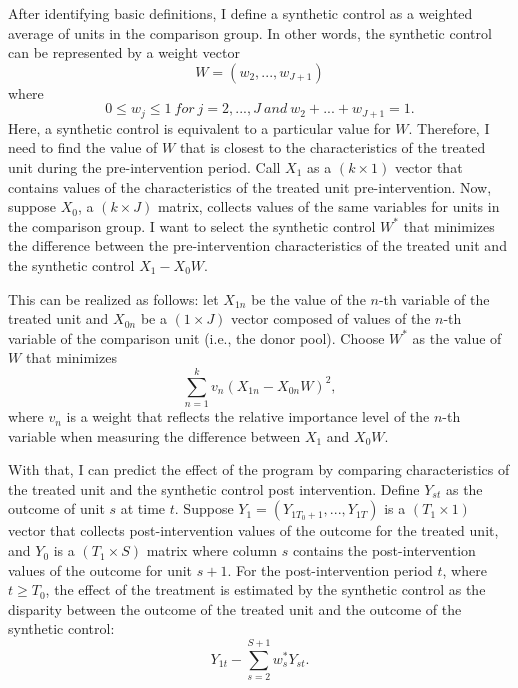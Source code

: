 \noindent After identifying basic definitions, I define a synthetic control as a weighted average of units in the comparison group. In other words, the synthetic control can be represented by a weight vector
\[
W=(w_2,...,w_{J+1})
\]
where 
\[
0\leq w_j\leq 1~for~j=2,...,J~and~w_2+...+w_{J+1}=1.
\]
Here, a synthetic control is equivalent to a particular value for $W$. Therefore, I need to find the value of $W$ that is closest to the characteristics of the treated unit during the pre-intervention period. Call $X_1$ as a $(k\times 1)$ vector that contains values of the characteristics of the treated unit pre-intervention. Now, suppose $X_0$, a $(k\times J)$ matrix, collects values of the same variables for units in the comparison group. I want to select the synthetic control $W^*$ that minimizes the difference between the pre-intervention characteristics of the treated unit and the synthetic control $X_1-X_0W$.

\noindent This can be realized as follows: let $X_{1n}$ be the value of the $n$-th variable of the treated unit and $X_{0n}$ be a $(1\times J)$ vector composed of values of the $n$-th variable of the comparison unit (i.e., the donor pool). Choose $W^*$ as the value of $W$ that minimizes
\[
\sum^k_{n=1}v_n(X_{1n}-X_{0n}W)^2,
\]
where $v_n$ is a weight that reflects the relative importance level of the $n$-th variable when measuring the difference between $X_1$ and $X_0W$.

\noindent With that, I can predict the effect of the program by comparing characteristics of the treated unit and the synthetic control post intervention. Define $Y_{st}$ as the outcome of unit $s$ at time $t$. Suppose $Y_1=(Y_{1T_0+1},...,Y_{1T})$ is a $(T_1\times 1)$ vector that collects post-intervention values of the outcome for the treated unit, and $Y_0$ is a $(T_1\times S)$ matrix where column $s$ contains the post-intervention values of the outcome for unit $s+1$. For the post-intervention period $t$, where $t\geq T_0$, the effect of the treatment is estimated by the synthetic control as the disparity between the outcome of the treated unit and the outcome of the synthetic control:
\[
Y_{1t}-\sum^{S+1}_{s=2}w_s^*Y_{st}.
\]

